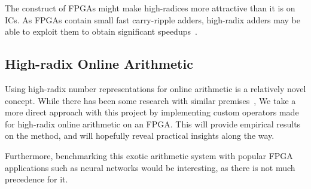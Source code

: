 The construct of FPGAs might make high-radices more attractive than it is on
ICs.
As FPGAs contain small fast carry-ripple adders, high-radix adders may be able
to exploit them to obtain significant speedups~\cite{Kornerup1}.

\subsection{High-radix Online Arithmetic}
Using high-radix number representations for online arithmetic is a
relatively novel concept.
While there has been some research with similar
premises~\cite{Lynch1}\cite{Lynch2},
We take a more direct approach with this project by implementing custom
operators made for high-radix online arithmetic on an FPGA.
This will provide empirical results on the method, and will hopefully reveal
practical insights along the way.

Furthermore, benchmarking this exotic arithmetic system with popular FPGA
applications such as neural networks would be interesting, as there is not
much precedence for it.
